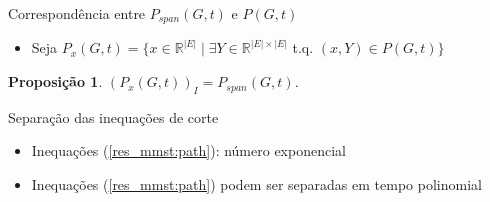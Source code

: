 \documentclass[dvipsnames]{beamer}
\newtheorem{proposicao}{Proposição}
\newcommand{\espacoX}{\mathbb{R}^{|E|}}
\newcommand{\espacoY}{\mathbb{R}^{|E| \times |E|}}
\begin{document}
\begin{frame}{Correspondência entre $P_{span}(G,t)$ e $P(G,t)$}
  \begin{itemize}
    \item[] Seja $P_{x}(G,t) = \{x \in \espacoX\; |\; \exists Y \in \espacoY$ t.q. 
$(x,Y) \in P(G,t)\}$
    \end{itemize}
\begin{proposicao}
 $(P_{x}(G,t))_{I} = P_{span}(G,t)$.
\end{proposicao}
  \end{frame}

\begin{frame}{Separação das inequações de corte}
  
  \begin{itemize}
  \item Inequações (\ref{res_mmst:path}): número exponencial
    \item <2->Inequações (\ref{res_mmst:path}) podem ser separadas em tempo polinomial
    \end{itemize}
  \end{frame}

\end{document}
